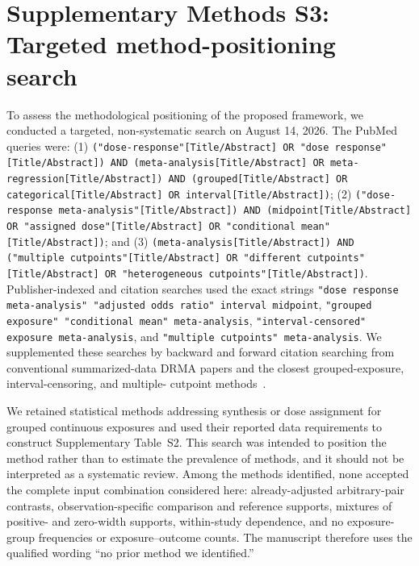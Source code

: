 \documentclass[11pt]{article}
\begin{document}
\section*{Supplementary Methods S3: Targeted method-positioning search}

\begin{flushleft}
\footnotesize
To assess the methodological positioning of the proposed framework, we
conducted a targeted, non-systematic search on August 14, 2026. The PubMed
queries were: (1) \texttt{("dose-response"[Title/Abstract] OR "dose response"[Title/Abstract]) AND (meta-analysis[Title/Abstract] OR meta-regression[Title/Abstract]) AND (grouped[Title/Abstract] OR categorical[Title/Abstract] OR interval[Title/Abstract])}; (2)
\texttt{("dose-response meta-analysis"[Title/Abstract]) AND (midpoint[Title/Abstract] OR "assigned dose"[Title/Abstract] OR "conditional mean"[Title/Abstract])}; and (3)
\texttt{(meta-analysis[Title/Abstract]) AND ("multiple cutpoints"[Title/Abstract] OR "different cutpoints"[Title/Abstract] OR "heterogeneous cutpoints"[Title/Abstract])}. Publisher-indexed and citation searches used the exact strings
\texttt{"dose response meta-analysis" "adjusted odds ratio" interval midpoint},
\texttt{"grouped exposure" "conditional mean" meta-analysis},
\texttt{"interval-censored" exposure meta-analysis}, and
\texttt{"multiple cutpoints" meta-analysis}. We supplemented these searches by
backward and forward citation searching from conventional summarized-data DRMA
papers and the closest grouped-exposure, interval-censoring, and multiple-
cutpoint methods~\cite{Greenland1992,Orsini2012,Cook2001,Allen2020,Allen2020b,Takahashi2010,ShiCopas2004,Hartemink2006,Riley2015,Yu2013,Bauleo2026}.
\end{flushleft}

We retained statistical methods addressing synthesis or dose assignment for
grouped continuous exposures and used their reported data requirements to
construct Supplementary Table~S2. This search was intended to position
the method rather than to estimate the prevalence of methods, and it should
not be interpreted as a systematic review. Among the methods identified, none
accepted the complete input combination considered here: already-adjusted
arbitrary-pair contrasts, observation-specific comparison and reference
supports, mixtures of positive- and zero-width supports, within-study
dependence, and no exposure-group frequencies or exposure--outcome counts.
The manuscript therefore uses the qualified wording ``no prior method we
identified.''
\end{document}
